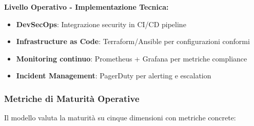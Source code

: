 \textbf{Livello Operativo - Implementazione Tecnica:}
\begin{itemize}
    \item \textbf{DevSecOps}: Integrazione security in CI/CD pipeline
    \item \textbf{Infrastructure as Code}: Terraform/Ansible per configurazioni conformi
    \item \textbf{Monitoring continuo}: Prometheus + Grafana per metriche compliance
    \item \textbf{Incident Management}: PagerDuty per alerting e escalation
\end{itemize}

\subsubsection{Metriche di Maturità Operative}

Il modello valuta la maturità su cinque dimensioni con metriche concrete:

